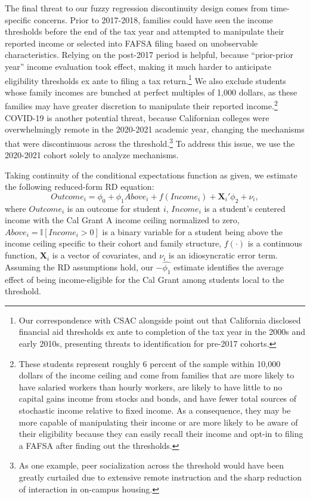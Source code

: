 \documentclass[12pt,letterpaper,oneside]{book}
\begin{document}
The final threat to our fuzzy regression discontinuity design comes from time-specific concerns. Prior to 2017-2018, families could have seen the income thresholds before the end of the tax year and attempted to manipulate their reported income or selected into FAFSA filing based on unobservable characteristics. Relying on the post-2017 period is helpful, because ``prior-prior year'' income evaluation took effect, making it much harder to anticipate eligibility thresholds ex ante to filing a tax return.\footnote{Our correspondence with CSAC alongside \cite{bettinger_long-run_2019} point out that California disclosed financial aid thresholds ex ante to completion of the tax year in the 2000s and early 2010s, presenting threats to identification for pre-2017 cohorts.} We also exclude students whose family incomes are bunched at perfect multiples of 1,000 dollars, as these families may have greater discretion to manipulate their reported income.\footnote{These students represent roughly 6 percent of the sample within 10,000 dollars of the income ceiling and come from families that are more likely to have salaried workers than hourly workers, are likely to have little to no capital gains income from stocks and bonds, and have fewer total sources of stochastic income relative to fixed income. As a consequence, they may be more capable of manipulating their income or are more likely to be aware of their eligibility because they can easily recall their income and opt-in to filing a FAFSA after finding out the thresholds.} COVID-19 is another potential threat, because Californian colleges were overwhelmingly remote in the 2020-2021 academic year, changing the mechanisms that were discontinuous across the threshold.\footnote{As one example, peer socialization across the threshold would have been greatly curtailed due to extensive remote instruction and the sharp reduction of interaction in on-campus housing.} To address this issue, we use the 2020-2021 cohort solely to analyze mechanisms.

Taking continuity of the conditional expectations function as given, we estimate the following reduced-form RD equation:
\begin{equation} Outcome_{i}=\phi_0 +\phi_1 Above_{i}+ f(Income_{i})+\textbf{X}_{i}'\phi_2+\nu_{i},
\end{equation}
where $Outcome_{i}$ is an outcome for student $i$, $Income_{i}$ is a student's centered income with the Cal Grant A income ceiling normalized to zero, $Above_{i}=\mathbb{I}[Income_{i}> 0]$ is a binary variable for a student being above the income ceiling specific to their cohort and family structure, $f(\cdot)$ is a continuous function, $\textbf{X}_{i}$ is a vector of covariates, and $\nu_{i}$ is an idiosyncratic error term. Assuming the RD assumptions hold, our $-\hat{\phi_1}$ estimate identifies the average effect of being income-eligible for the Cal Grant among students local to the threshold.
\end{document}
